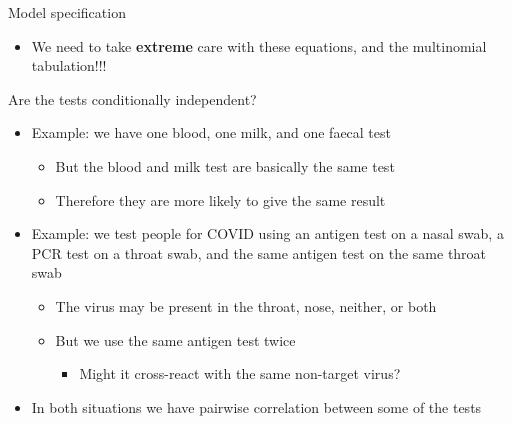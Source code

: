 \documentclass[
  ignorenonframetext,
  aspectratio=169,
]{beamer}
\providecommand{\tightlist}{%
  \setlength{\itemsep}{0pt}\setlength{\parskip}{0pt}}
\begin{document}
\begin{frame}[fragile]{Model specification}
\normalsize

\pause

\begin{itemize}
\tightlist
\item
  We need to take \textbf{extreme} care with these equations, and the
  multinomial tabulation!!!
\end{itemize}
\end{frame}

\begin{frame}{Are the tests conditionally independent?}
\protect\hypertarget{are-the-tests-conditionally-independent}{}
\begin{itemize}
\item
  Example: we have one blood, one milk, and one faecal test

  \begin{itemize}
  \tightlist
  \item
    But the blood and milk test are basically the same test
  \item
    Therefore they are more likely to give the same result
  \end{itemize}
\end{itemize}

\pause

\begin{itemize}
\item
  Example: we test people for COVID using an antigen test on a nasal
  swab, a PCR test on a throat swab, and the same antigen test on the
  same throat swab

  \begin{itemize}
  \tightlist
  \item
    The virus may be present in the throat, nose, neither, or both
  \item
    But we use the same antigen test twice

    \begin{itemize}
    \tightlist
    \item
      Might it cross-react with the same non-target virus?
    \end{itemize}
  \end{itemize}
\end{itemize}

\pause

\begin{itemize}
\tightlist
\item
  In both situations we have pairwise correlation between some of the
  tests
\end{itemize}
\end{frame}
\end{document}
